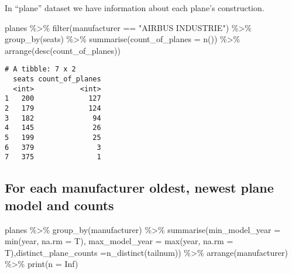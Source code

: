 \documentclass[
  letterpaper,
  DIV=11,
  numbers=noendperiod]{scrreprt}
\newenvironment{Shaded}{\begin{snugshade}}{\end{snugshade}}
\newcommand{\AttributeTok}[1]{\textcolor[rgb]{0.40,0.45,0.13}{#1}}
\newcommand{\ConstantTok}[1]{\textcolor[rgb]{0.56,0.35,0.01}{#1}}
\newcommand{\FunctionTok}[1]{\textcolor[rgb]{0.28,0.35,0.67}{#1}}
\newcommand{\NormalTok}[1]{\textcolor[rgb]{0.00,0.23,0.31}{#1}}
\newcommand{\SpecialCharTok}[1]{\textcolor[rgb]{0.37,0.37,0.37}{#1}}
\newcommand{\StringTok}[1]{\textcolor[rgb]{0.13,0.47,0.30}{#1}}
\begin{document}
In ``plane'' dataset we have information about each plane's
construction.

\begin{Shaded}
\begin{Highlighting}[]
\NormalTok{planes }\SpecialCharTok{\%\textgreater{}\%} 
  \FunctionTok{filter}\NormalTok{(manufacturer }\SpecialCharTok{==} \StringTok{"AIRBUS INDUSTRIE"}\NormalTok{) }\SpecialCharTok{\%\textgreater{}\%} 
  \FunctionTok{group\_by}\NormalTok{(seats) }\SpecialCharTok{\%\textgreater{}\%} 
  \FunctionTok{summarise}\NormalTok{(}\AttributeTok{count\_of\_planes =} \FunctionTok{n}\NormalTok{()) }\SpecialCharTok{\%\textgreater{}\%} 
  \FunctionTok{arrange}\NormalTok{(}\FunctionTok{desc}\NormalTok{(count\_of\_planes))}
\end{Highlighting}
\end{Shaded}

\begin{verbatim}
# A tibble: 7 x 2
  seats count_of_planes
  <int>           <int>
1   200             127
2   179             124
3   182              94
4   145              26
5   199              25
6   379               3
7   375               1
\end{verbatim}

\hypertarget{for-each-manufacturer-oldest-newest-plane-model-and-counts}{%
\subsection{For each manufacturer oldest, newest plane model and
counts}\label{for-each-manufacturer-oldest-newest-plane-model-and-counts}}

\begin{Shaded}
\begin{Highlighting}[]
\NormalTok{planes }\SpecialCharTok{\%\textgreater{}\%} 
  \FunctionTok{group\_by}\NormalTok{(manufacturer) }\SpecialCharTok{\%\textgreater{}\%} 
  \FunctionTok{summarise}\NormalTok{(}\AttributeTok{min\_model\_year =} \FunctionTok{min}\NormalTok{(year, }\AttributeTok{na.rm =}\NormalTok{ T), }\AttributeTok{max\_model\_year =} \FunctionTok{max}\NormalTok{(year, }\AttributeTok{na.rm =}\NormalTok{ T),}\AttributeTok{distinct\_plane\_counts =}\FunctionTok{n\_distinct}\NormalTok{(tailnum)) }\SpecialCharTok{\%\textgreater{}\%} 
  \FunctionTok{arrange}\NormalTok{(manufacturer)  }\SpecialCharTok{\%\textgreater{}\%}
  \FunctionTok{print}\NormalTok{(}\AttributeTok{n =} \ConstantTok{Inf}\NormalTok{) }
\end{Highlighting}
\end{Shaded}
\end{document}
